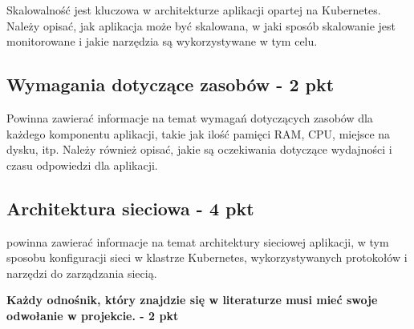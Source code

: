 \documentclass[12pt,a4paper]{article}
\begin{document}
Skalowalność jest kluczowa w architekturze aplikacji opartej na Kubernetes. Należy opisać, jak aplikacja może być skalowana, w jaki sposób skalowanie jest monitorowane i jakie narzędzia są wykorzystywane w tym celu.

\subsection{Wymagania dotyczące zasobów - 2 pkt}
\label{sec:ExampleTables}

Powinna zawierać informacje na temat wymagań dotyczących zasobów dla każdego komponentu aplikacji, takie jak ilość pamięci RAM, CPU, miejsce na dysku, itp. Należy również opisać, jakie są oczekiwania dotyczące wydajności i czasu odpowiedzi dla aplikacji.


\subsection{Architektura sieciowa - 4 pkt}
\label{sec:ExampleResults}

powinna zawierać informacje na temat architektury sieciowej aplikacji, w tym sposobu konfiguracji sieci w klastrze Kubernetes, wykorzystywanych protokołów i narzędzi do zarządzania siecią.

\noindent
\textbf{Każdy odnośnik, który znajdzie się w literaturze musi mieć swoje odwołanie w projekcie. - 2 pkt} 



\nocite{*}
\end{document}
